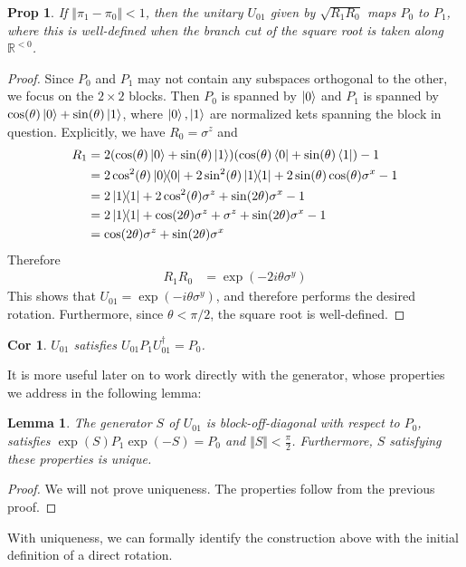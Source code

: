 \documentclass[11pt]{article}
\newtheorem{prop}{Prop}
\newtheorem{lem}{Lemma}
\newtheorem{cor}{Cor}
\begin{document}
\begin{prop}
    If $\Vert \pi_1 - \pi_0 \Vert < 1$, then the unitary $U_{01}$ given by $\sqrt{R_1R_0}$ maps $P_0$ to $P_1$, where this is well-defined when the branch cut of the square root is taken along $\mathbb R^{<0}$. 
\end{prop}
\begin{proof}
    Since $P_0$ and $P_1$ may not contain any subspaces orthogonal to the other, we focus on the $2\times 2$ blocks. Then $P_0$ is spanned by $\ket{0}$ and $P_1$ is spanned by $\cos(\theta)\ket{0} + \sin(\theta)\ket{1}$, where $\ket{0}, \ket{1}$ are normalized kets spanning the block in question. Explicitly, we have $R_0 = \sigma^z$ and 
\begin{align}
    R_1 &= 2(\cos(\theta)\ket{0} + \sin(\theta)\ket{1})(\cos(\theta)\bra{0} + \sin(\theta)\bra{1}) - 1 \\
        &= 2\cos[2](\theta)\ketbra{0}{0} + 2\sin[2](\theta)\ketbra{1}{1} + 2\sin(\theta)\cos(\theta)\sigma^x-1 \\
        &= 2\ketbra{1}{1}  + 2\cos[2](\theta)\sigma^z + \sin(2\theta)\sigma^x-1 \\
        &= 2\ketbra{1}{1}  +\cos(2\theta)\sigma^z + \sigma^z + \sin(2\theta)\sigma^x-1 \\
        &= \cos(2\theta)\sigma^z + \sin(2\theta)\sigma^x
\end{align}
Therefore
\begin{align}
    R_1R_0 &= \exp(-2i\theta \sigma^y)
\end{align}
This shows that $U_{01} = \exp(-i\theta \sigma^y)$, and therefore performs the desired rotation. Furthermore, since $\theta < \pi/2$, the square root is well-defined.
\end{proof}
\begin{cor}
    $U_{01}$ satisfies $U_{01}P_1 U_{01}^\dagger = P_0$. 
\end{cor}
It is more useful later on to work directly with the generator, whose properties we address in the following lemma:
\begin{lem}
    The generator $S$ of $U_{01}$ is block-off-diagonal with respect to $P_0$, satisfies $\exp(S)P_1\exp(-S) = P_0$ and $\Vert S \Vert < \frac{\pi}{2}$. Furthermore, $S$ satisfying these properties is unique.
\end{lem}
\begin{proof}
    We will not prove uniqueness. The properties follow from the previous proof.
\end{proof}
With uniqueness, we can formally identify the construction above with the initial definition of a direct rotation.
\end{document}

